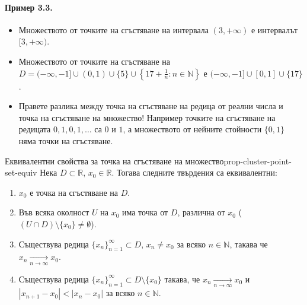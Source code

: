 \paragraph{Пример 3.3.}
\begin{itemize}
    \item Множеството от точките на сгъстяване на интервала $(3, +\infty)$ е интервалът $[3, +\infty)$.
    \item Множеството от точките на сгъстяване на $D = (-\infty, -1] \cup (0, 1) \cup \{5\} \cup \left\{17 + \frac{1}{n} : n \in \mathbb{N}\right\}$ е $(-\infty, -1] \cup [0, 1] \cup \{17\}$.
    \item Правете разлика между точка на сгъстяване на редица от реални числа и точка на сгъстяване на множество! Например точките на сгъстяване на редицата $0, 1, 0, 1, \dots$ са $0$ и $1$, а множеството от нейните стойности $\{0, 1\}$ няма точки на сгъстяване.
\end{itemize}

\begin{theorem}{Еквивалентни свойства за точка на сгъстяване на множество}{prop-cluster-point-set-equiv}
Нека $D \subset \mathbb{R}$, $x_0 \in \mathbb{R}$. Тогава следните твърдения са еквивалентни:
\begin{enumerate}
    \item $x_0$ е точка на сгъстяване на $D$.
    \item Във всяка околност $U$ на $x_0$ има точка от $D$, различна от $x_0$ ($(U \cap D) \setminus \{x_0\} \ne \emptyset$).
    \item Съществува редица $\{x_n\}_{n=1}^{\infty} \subset D$, $x_n \ne x_0$ за всяко $n \in \mathbb{N}$, такава че $x_n \xrightarrow[n\to\infty]{} x_0$.
    \item Съществува редица $\{x_n\}_{n=1}^{\infty} \subset D \setminus \{x_0\}$ такава, че $x_n \xrightarrow[n\to\infty]{} x_0$ и $|x_{n+1} - x_0| < |x_n - x_0|$ за всяко $n \in \mathbb{N}$.
\end{enumerate}
\end{theorem}

